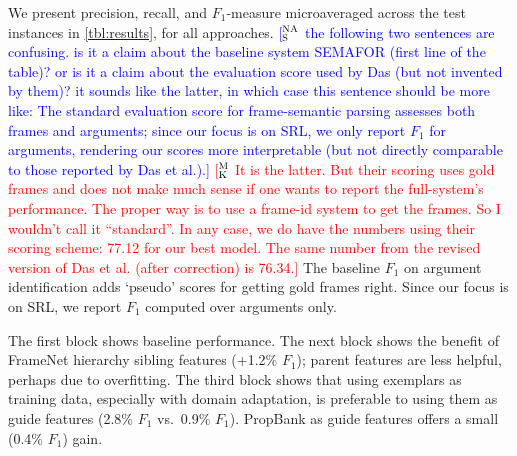 \documentclass[11pt,a4paper]{article}
\newcommand{\ensuretext}[1]{#1}
\newcommand{\nssmarker}{\ensuretext{\textcolor{magenta}{\ensuremath{^{\textsc{NS}}_{\textsc{S}}}}}}
\newcommand{\mkmarker}{\ensuretext{\textcolor{red}{\ensuremath{^{\textsc{M}}_{\textsc{K}}}}}}
\newcommand{\nasmarker}{\ensuretext{\textcolor{blue}{\ensuremath{^{\textsc{NA}}_{\textsc{S}}}}}}
\newcommand{\arkcomment}[3]{\ensuretext{\textcolor{#3}{[#1 #2]}}}
\newcommand{\nss}[1]{\arkcomment{\nssmarker}{#1}{magenta}}
\newcommand{\mk}[1]{\arkcomment{\mkmarker}{#1}{red}}
\newcommand{\nascomment}[1]{\arkcomment{\nasmarker}{#1}{blue}}
\newcommand{\finalversion}[1]{}
\begin{document}



We present precision, recall, and $F_1$-measure microaveraged across the test
instances in \cref{tbl:results}, for all approaches. %
\nascomment{the following two sentences  are confusing.  is it a claim about
  the baseline system SEMAFOR (first line of the table)?  or is it a claim
  about the evaluation score used by Das (but not invented by them)?
  it sounds like the latter, in which case this sentence should be
  more like:  The standard evaluation score for frame-semantic parsing
assesses both frames and arguments; since our focus is on SRL, we only
report $F_1$ for arguments, rendering our scores more interpretable
(but not directly comparable to those reported by Das et al.).}
\mk{It is the latter. But their scoring uses gold frames and does not make much 
sense if one wants to report the full-system's performance. The proper
way is to use a frame-id system to get the frames. So I wouldn't call it ``standard''.
In any case, we do have the numbers using their scoring scheme: 77.12 for our best model. 
The same number from the revised version of Das et al. (after correction) is 76.34.}
The baseline $F_1$ on argument identification \citep{das-14} adds `pseudo' scores for getting gold frames right. 
Since our focus is on SRL, we report $F_1$ computed over arguments
only. 

The first block shows baseline performance.  The next block shows the
benefit of FrameNet hierarchy sibling features (+1.2\% $F_1$); parent features
are less helpful, perhaps due to overfitting.  The third block shows
that using exemplars as training data, especially with domain
adaptation, is preferable to using them as guide features (2.8\% $F_1$
vs.~0.9\% $F_1$).  PropBank
as guide features offers a small (0.4\% $F_1$) gain.









\end{document}
